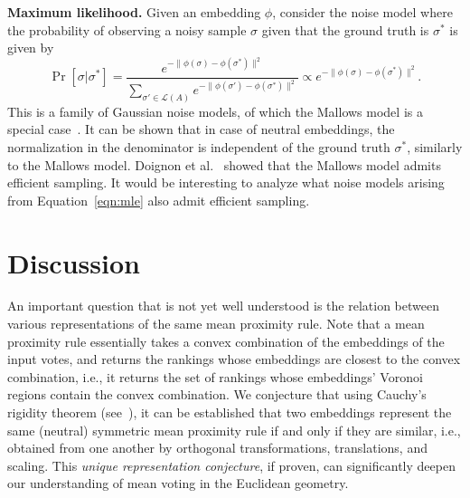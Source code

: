 \documentclass[prodmode,acmec]{ec-acmsmall}
\newcommand{\calL}{{\mathcal{L}}}
\newcommand{\rank}{{\calL(A)}}
\begin{document}
\medskip
\noindent \textbf{Maximum likelihood.} Given an embedding $\phi$, consider the noise model where the probability of observing a noisy sample $\sigma$ given that the ground truth is $\sigma^*$ is given by 
\begin{equation}
\Pr[\sigma | \sigma^*] = \frac{e^{-\|\phi(\sigma)-\phi(\sigma^*)\|^2}}{\sum_{\sigma' \in \rank} e^{-\|\phi(\sigma')-\phi(\sigma^*)\|^2}} \propto e^{-\|\phi(\sigma)-\phi(\sigma^*)\|^2}.
\label{eqn:mle}
\end{equation}
%
This is a family of Gaussian noise models, of which the Mallows model is a special case~\cite{Mall57}. It can be shown that in case of neutral embeddings, the normalization in the denominator is independent of the ground truth $\sigma^*$, similarly to the Mallows model. Doignon et al.~ showed that the Mallows model admits efficient sampling. It would be interesting to analyze what noise models arising from Equation~\eqref{eqn:mle} also admit efficient sampling. 


\section{Discussion}
\label{sec:disc}

An important question that is not yet well understood is the relation between various representations of the same mean proximity rule. Note that a mean proximity rule essentially takes a convex combination of the embeddings of the input votes, and returns the rankings whose embeddings are closest to the convex combination, i.e., it returns the set of rankings whose embeddings' Voronoi regions contain the convex combination. We conjecture that using Cauchy's rigidity theorem (see~\cite{aigner2010cauchy}), it can be established that two embeddings represent the same (neutral) symmetric mean proximity rule if and only if they are similar, i.e., obtained from one another by orthogonal transformations, translations, and scaling. This \emph{unique representation conjecture}, if proven, can significantly deepen our understanding of mean voting in the Euclidean geometry. 
\end{document}
